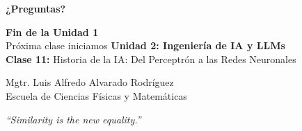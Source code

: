 \documentclass[aspectratio=169]{beamer}
\begin{document}
\begin{frame}
    \centering
    \Huge \textbf{¿Preguntas?}
    
    \vspace{0.6cm}
    \large
    \textbf{Fin de la Unidad 1}\\[0.3cm]
    \normalsize
    Próxima clase iniciamos \textbf{Unidad 2: Ingeniería de IA y LLMs}\\
    \textbf{Clase 11:} Historia de la IA: Del Perceptrón a las Redes Neuronales
    
    \vspace{0.5cm}
    \normalsize
    Mgtr. Luis Alfredo Alvarado Rodríguez\\
    \small Escuela de Ciencias Físicas y Matemáticas
    
    \vspace{0.4cm}
    \footnotesize
    \textit{``Similarity is the new equality.''}
\end{frame}
\end{document}
